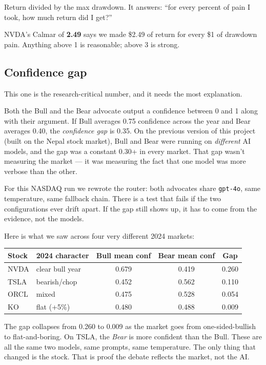 \documentclass[11pt,a4paper]{article}
\begin{document}
Return divided by the max drawdown. It answers: ``for every percent of
pain I took, how much return did I get?''

NVDA's Calmar of \textbf{2.49} says we made \$2.49 of return for every
\$1 of drawdown pain. Anything above 1 is reasonable; above 3 is strong.

\subsection*{Confidence gap}

This one is the research-critical number, and it needs the most explanation.

Both the Bull and the Bear advocate output a confidence between 0 and 1
along with their argument. If Bull averages 0.75 confidence across the
year and Bear averages 0.40, the \textit{confidence gap} is 0.35. On the
previous version of this project (built on the Nepal stock market), Bull
and Bear were running on \textit{different} AI models, and the gap was a
constant 0.30+ in every market. That gap wasn't measuring the market ---
it was measuring the fact that one model was more verbose than the other.

For this NASDAQ run we rewrote the router: both advocates share
\texttt{gpt-4o}, same temperature, same fallback chain. There is a
test that fails if the two configurations ever drift apart. If the gap
still shows up, it has to come from the evidence, not the models.

Here is what we saw across four very different 2024 markets:

\begin{center}
\begin{tabular}{llccc}
\toprule
Stock & 2024 character & Bull mean conf & Bear mean conf & Gap \\
\midrule
NVDA & clear bull year     & 0.679 & 0.419 & 0.260 \\
TSLA & bearish/chop        & 0.452 & 0.562 & 0.110 \\
ORCL & mixed               & 0.475 & 0.528 & 0.054 \\
KO   & flat (+5\%)         & 0.480 & 0.488 & 0.009 \\
\bottomrule
\end{tabular}
\end{center}

The gap collapses from 0.260 to 0.009 as the market goes from
one-sided-bullish to flat-and-boring. On TSLA, the \textit{Bear} is more
confident than the Bull. These are all the same two models, same prompts,
same temperature. The only thing that changed is the stock. That is proof
the debate reflects the market, not the AI.
\end{document}
